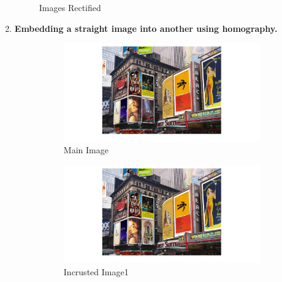 \documentclass[12pt, twoside]{report}
\begin{document}
\begin{enumerate}
\begin{figure}[H]
     \hfill 
        \caption{Images Rectified}
        \label{fig:inctotal}
\end{figure}

\item \textbf{Embedding a straight image into another using homography.}

\begin{figure}[H]
     \centering
     \begin{subfigure}[b]{0.3\textwidth}
         \centering
         \includegraphics[width=\textwidth]{images/tp_2/incruste1.jpg}
             \caption{Main Image}
         \label{fig:inc1}
     \end{subfigure}
     \hfill
     \begin{subfigure}[b]{0.3\textwidth}
         \centering
         \includegraphics[width=\textwidth]{images/tp_2/incruste2.jpg}
         \caption{Incrusted Image1}
         \label{fig:inc2}
     \end{subfigure}
     \hfill
     \begin{subfigure}[b]{0.3\textwidth}
         \centering

\end{subfigure}
\end{figure}
\end{enumerate}
\end{document}
